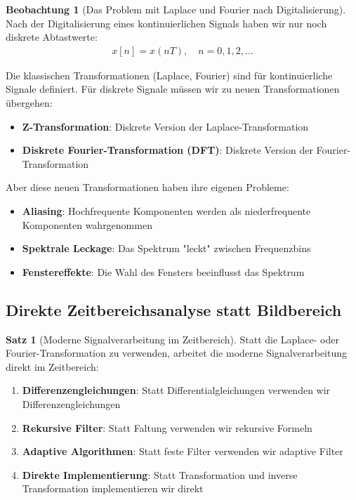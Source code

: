 ﻿\documentclass[a4paper,12pt]{report}
\theoremstyle{definition}
\newtheorem{satz}{Satz}
\newtheorem{beobachtung}{Beobachtung}
\begin{document}
	\begin{beobachtung}[Das Problem mit Laplace und Fourier nach Digitalisierung]
		
		Nach der Digitalisierung eines kontinuierlichen Signals haben wir nur noch diskrete Abtastwerte:
		\begin{align}
			x[n] = x(nT), \quad n = 0, 1, 2, \ldots
		\end{align}
		
		Die klassischen Transformationen (Laplace, Fourier) sind für kontinuierliche Signale definiert. Für diskrete Signale müssen wir zu neuen Transformationen übergehen:
		\begin{itemize}
			\item[-] \textbf{Z-Transformation}: Diskrete Version der Laplace-Transformation
			\item[-] \textbf{Diskrete Fourier-Transformation (DFT)}: Diskrete Version der Fourier-Transfor\-mation
		\end{itemize}
		
		Aber diese neuen Transformationen haben ihre eigenen Probleme:
		\begin{itemize}
			\item[-] \textbf{Aliasing}: Hochfrequente Komponenten werden als niederfrequente Komponenten wahrgenommen
			\item[-] \textbf{Spektrale Leckage}: Das Spektrum "leckt" zwischen Frequenzbins
			\item[-] \textbf{Fenstereffekte}: Die Wahl des Fensters beeinflusst das Spektrum
		\end{itemize}
	\end{beobachtung}
	
	\subsection{Direkte Zeitbereichsanalyse statt Bildbereich}
	
	\begin{satz}[Moderne Signalverarbeitung im Zeitbereich]
		
		Statt die Laplace- oder Fourier-Transformation zu verwenden, arbeitet die moderne Signalverarbeitung direkt im Zeitbereich:
		
		\begin{enumerate}
			\item[-] \textbf{Differenzengleichungen}: Statt Differentialgleichungen verwenden wir Differenzengleichungen
			\item[-] \textbf{Rekursive Filter}: Statt Faltung verwenden wir rekursive Formeln
			\item[-] \textbf{Adaptive Algorithmen}: Statt feste Filter verwenden wir adaptive Filter
			\item[-] \textbf{Direkte Implementierung}: Statt Transformation und inverse Transformation implementieren wir direkt
		\end{enumerate}
	\end{satz}
	
\end{document}
